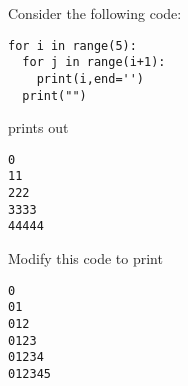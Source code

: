  \begin{exercise}
 
 

Consider the following code:

\begin{Verbatim}
for i in range(5):
  for j in range(i+1):
    print(i,end='')
  print("")
\end{Verbatim}
prints out
\begin{Verbatim}
0
11
222
3333
44444
\end{Verbatim}
Modify this code to print
\begin{Verbatim}
0
01
012
0123
01234
012345
\end{Verbatim}
\end{exercise}



 
 
